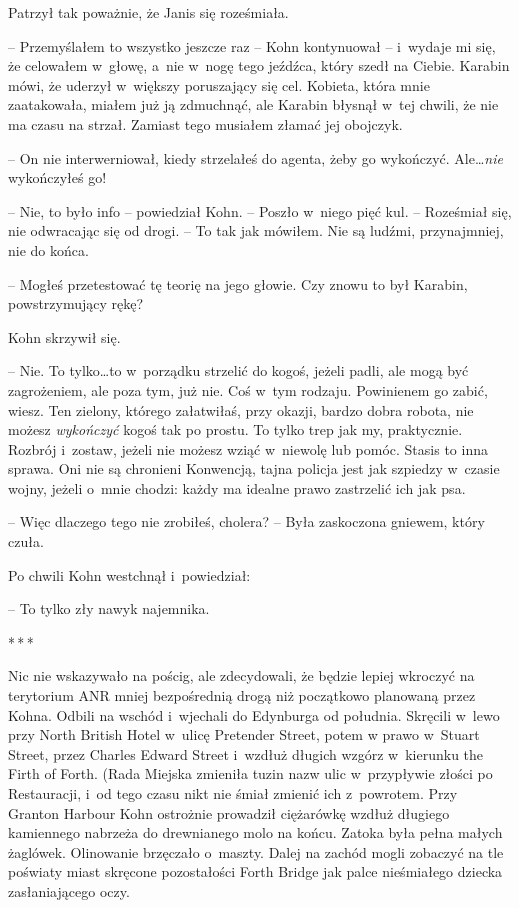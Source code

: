 \documentclass[oneside,polish,11pt,sfheadings]{mwbk}
\newcommand{\threeast}{\bigskip\par\centerline{*\,*\,*}\medskip\par}%
\begin{document}
Patrzył tak poważnie, że Janis się roześmiała.

-- Przemyślałem to wszystko jeszcze raz -- Kohn kontynuował -- i~wydaje mi
się, że celowałem w~głowę, a~nie w~nogę tego jeźdźca, który szedł na
Ciebie. Karabin mówi, że uderzył w~większy poruszający się cel. Kobieta,
która mnie zaatakowała, miałem już ją zdmuchnąć, ale Karabin błysnął w~tej chwili, że nie ma czasu na strzał. Zamiast tego musiałem złamać jej
obojczyk.

-- On nie interwerniował, kiedy strzelałeś do agenta, żeby go wykończyć.
Ale\ldots \emph{nie} wykończyłeś go!

-- Nie, to było info -- powiedział Kohn. -- Poszło w~niego pięć kul. -- Roześmiał się, nie odwracając się od drogi. -- To tak jak mówiłem. Nie są
ludźmi, przynajmniej, nie do końca.

-- Mogłeś przetestować tę teorię na jego głowie. Czy znowu to był
Karabin, powstrzymujący rękę?

Kohn skrzywił się. 

-- Nie. To tylko\ldots to w~porządku strzelić do kogoś,
jeżeli padli, ale mogą być zagrożeniem, ale poza tym, już nie. Coś w~tym
rodzaju. Powinienem go zabić, wiesz. Ten zielony, którego załatwiłaś,
przy okazji, bardzo dobra robota, nie możesz \emph{wykończyć} kogoś tak
po prostu. To tylko trep jak my, praktycznie. Rozbrój i~zostaw, jeżeli
nie możesz wziąć w~niewolę lub pomóc. Stasis to inna sprawa. Oni nie są
chronieni Konwencją, tajna policja jest jak szpiedzy w~czasie wojny,
jeżeli o~mnie chodzi: każdy ma idealne prawo zastrzelić ich jak psa.

-- Więc dlaczego tego nie zrobiłeś, cholera? -- Była zaskoczona gniewem,
który czuła.

Po chwili Kohn westchnął i~powiedział: 

-- To tylko zły nawyk najemnika.

  \threeast 

Nic nie wskazywało na pościg, ale zdecydowali, że będzie lepiej wkroczyć
na terytorium ANR mniej bezpośrednią drogą niż początkowo planowaną
przez Kohna. Odbili na wschód i~wjechali do Edynburga od południa.
Skręcili w~lewo przy North British Hotel w~ulicę Pretender Street, potem
w prawo w~Stuart Street, przez Charles Edward Street i~wzdłuż długich
wzgórz w~kierunku the Firth of Forth. (Rada Miejska zmieniła tuzin nazw
ulic w~przypływie złości po Restauracji, i~od tego czasu nikt nie śmiał
zmienić ich z~powrotem. Przy Granton Harbour Kohn ostrożnie prowadził
ciężarówkę wzdłuż długiego kamiennego nabrzeża do drewnianego molo na
końcu. Zatoka była pełna małych żaglówek. Olinowanie brzęczało o~maszty.
Dalej na zachód mogli zobaczyć na tle poświaty miast skręcone
pozostałości Forth Bridge jak palce nieśmiałego dziecka zasłaniającego
oczy.
\end{document}
